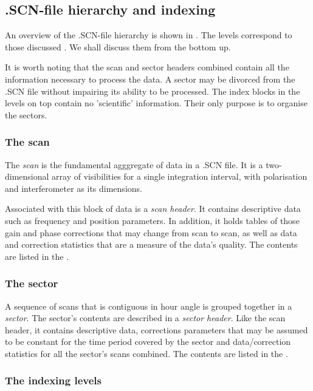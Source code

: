\subsection{ .SCN-file hierarchy and indexing } 
\label{.hierarchy} 

        An overview of the .SCN-file hierarchy is shown in 
. The levels correspond to those discussed 
. We shall discuss them from the bottom up. 

        It is worth noting that the scan and sector headers combined contain
all the information necessary to process the data. A sector may be divorced
from the .SCN file without impairing its ability to be processed. The index
blocks in the levels on top contain no 'scientific' information. Their only
purpose is to organise the sectors. 


\subsubsection{ The scan} 
\label{.scan} 

        The {\em scan} is the fundamental agggregate of data in a .SCN file. It
is a two-dimensional array of visibilities for a single integration interval,
with polarisation and interferometer as its dimensions. 

        Associated with this block of data is a {\em scan header}. It contains
descriptive data such as frequency and position parameters. In addition, it
holds tables of those gain and phase corrections that may change from scan to
scan, as well as data and correction statistics that are a measure of the
data's quality. The contents are listed in the .  


\subsubsection{ The sector} 
\label{.sector} 

        A sequence of scans that is contiguous in hour angle is grouped
together in a {\em sector}. The sector's contents are described in a {\em
sector header}. Like the scan header, it contains descriptive data, corrections
parameters that may be assumed to be constant for the time period covered by
the sector and data/correction statistics for all the sector's scans combined.
The contents are listed in the . 


\subsubsection{ The indexing levels } 
\label{.levels} 
\label{.SCNSUM.indices} 


